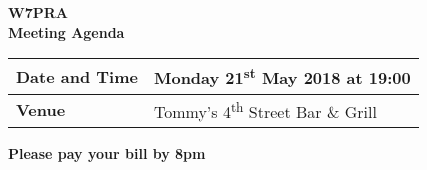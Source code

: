 \documentclass[letter,11pt]{extarticle}
\begin{document}
	\thispagestyle{empty}
	
	\begin{center}
		\textbf{W7PRA\\Meeting Agenda}
		\vspace{0.33cm}
	\end{center}
	
	\begin{center}
		\begin{tabular}{| m{3.0cm} | m{7.5cm} |} \hline
			\textbf{Date and Time} & Monday 21\textsuperscript{st} May 2018 at 19:00 \\ \hline
			\textbf{Venue} & Tommy's 4\textsuperscript{th} Street Bar \& Grill \\ \hline
				\end{tabular}
	\end{center}
	
	\begin{center}
		\textbf{Please pay your bill by 8pm}
	\end{center}
	
\end{document}
